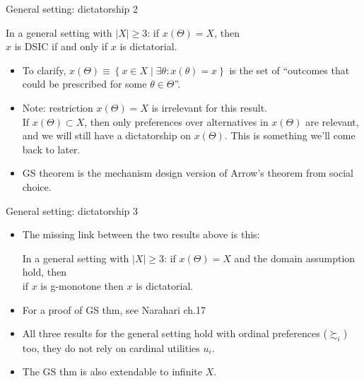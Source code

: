 \documentclass[english,10pt
,aspectratio=169
]{beamer}
\begin{document}
\begin{frame}{General setting: dictatorship 2}
	\begin{theorem}
		In a general setting with $|X|\geq 3$: if $x(\Theta)=X$, then\\
		\centering
		$x$ is \alert{DSIC} if and only if $x$ is \alert{dictatorial}.
	\end{theorem}
	\begin{itemize}
		\item To clarify, $x(\Theta) \equiv \left\{ x \in X \mid \exists \theta: x(\theta) = x \right\}$ is the set of ``outcomes that could be prescribed for some $\theta \in \Theta$''.
		\item Note: restriction $x(\Theta) = X$ is irrelevant for this result.\\
		If $x(\Theta) \subset X$, then only preferences over alternatives in $x(\Theta)$ are relevant, and we will still have a dictatorship on $x(\Theta)$. This is something we'll come back to later.
		\item GS theorem is the mechanism design version of Arrow's theorem from social choice.
	\end{itemize}
\end{frame}


\begin{frame}{General setting: dictatorship 3}
	\begin{itemize}
		\item The missing link between the two results above is this:
		\begin{theorem}
			In a general setting with $|X|\geq 3$: if $x(\Theta)=X$ and the domain assumption hold, then\\
			\centering
			if $x$ is g-monotone then $x$ is dictatorial.
		\end{theorem}
		\item For a proof of GS thm, see Narahari ch.17
		\item All three results for the general setting hold with ordinal preferences ($\succsim_i$) too, they do not rely on cardinal utilities $u_i$.
		\item The GS thm is also extendable to infinite $X$.
	\end{itemize}
\end{frame}
\end{document}
